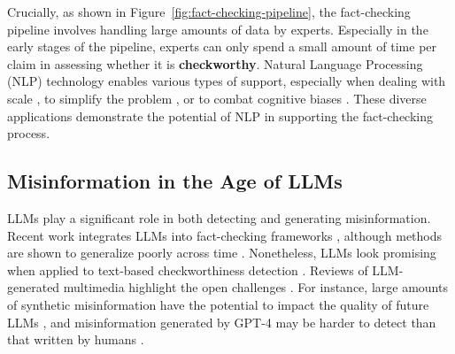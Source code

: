 Crucially, as shown in Figure~\ref{fig:fact-checking-pipeline}, the fact-checking pipeline involves handling large amounts of data by experts. Especially in the early stages of the pipeline, experts can only spend a small amount of time per claim in assessing whether it is \textbf{checkworthy}. Natural Language Processing (NLP) technology enables various types of support, especially when dealing with scale \citep{vandermeer2024facilitating, procter2023some}, to simplify the problem \citep{chen2022generating, bonet2024run}, or to combat cognitive biases \citep{soprano2024cognitive}. These diverse applications demonstrate the potential of NLP in supporting the fact-checking process.


\subsection{Misinformation in the Age of LLMs}
LLMs play a significant role in both detecting and generating misinformation. Recent work integrates LLMs into fact-checking frameworks \citep{geng2024multimodal}, although methods are shown to generalize poorly across time \citep{stepanova-ross-2023-temporal}. Nonetheless, LLMs look promising when applied to text-based checkworthiness detection \citep{majer2024claim}. Reviews of LLM-generated multimedia highlight the open challenges \citep{lin2024detecting, augenstein2024factuality}. For instance, large amounts of synthetic misinformation have the potential to impact the quality of future LLMs \citep{pan2023risk}, and misinformation generated by GPT-4 may be harder to detect than that written by humans \citep{chen2024combating}.

